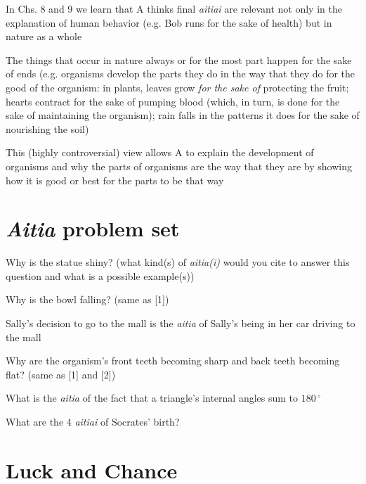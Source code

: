 \documentclass[11pt]{article}
\begin{document}
\noindent In Chs. 8 and 9 we learn that A thinks final \emph{aitiai} are relevant not only in the explanation of human behavior (e.g. Bob runs for the sake of health) but in nature as a whole
\newpage

\noindent The things that occur in nature always or for the most part happen for the sake of ends (e.g. organisms develop the parts they do in the way that they do for the good of the organism: in plants, leaves grow \emph{for the sake of} protecting the fruit; hearts contract for the sake of pumping blood (which, in turn, is done for the sake of maintaining the organism); rain falls in the patterns it does for the sake of nourishing the soil)
\vspace*{1mm}

\noindent This (highly controversial) view allows A to explain the development of organisms and why the parts of organisms are the way that they are by showing how it is good or best for the parts to be that way

\section*{\emph{Aitia} problem set}

\noindent [1] Why is the statue shiny? (what kind(s) of \emph{aitia(i)} would you cite to answer this question and what is a possible example(s))
\vspace*{3mm}

\noindent [2] Why is the bowl falling? (same as [1])
\vspace*{3mm}

\noindent [3] Sally's decision to go to the mall is the\hspace*{25mm} \emph{aitia} of Sally's being in her car driving to the mall
\vspace*{3mm}

\noindent [4] Why are the organism's front teeth becoming sharp and back teeth becoming flat? (same as [1] and [2]) 
\vspace*{3mm}

\noindent [5] What is the \emph{aitia} of the fact that a triangle's internal angles sum to $180\,^{\circ}$
\vspace*{3mm}

\noindent [6] What are the 4 \emph{aitiai} of Socrates' birth?

\section*{Luck and Chance}
\end{document}
